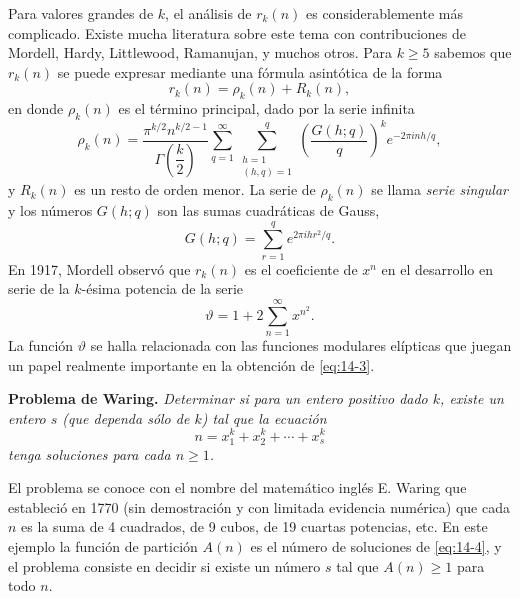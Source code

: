 \documentclass[12pt,a4paper]{book}
\begin{document}
    Para valores grandes de $k$, el análisis de $r_{k}(n)$ es considerablemente más complicado.
    Existe mucha literatura sobre este tema con contribuciones de Mordell, Hardy, Littlewood,
    Ramanujan, y muchos otros. Para $k\geq5$ sabemos que $r_{k}(n)$ se puede expresar mediante
    una fórmula asintótica de la forma
    \begin{equation}\label{eq:14-3}
        r_{k}(n)=\rho_{k}(n)+R_{k}(n),
    \end{equation}
    en donde $\rho_{k}(n)$ es el término principal, dado por la serie infinita
    \begin{equation*}
        \rho_{k}(n)=\frac{\pi^{k/2}n^{k/2-1}}{\Gamma\left(\dfrac{k}{2}\right)}\sum_{q=1}^{\infty}\sum_{\substack{h=1\\(h,q)=1}}^{q}\left(\frac{G(h;q)}{q}\right)^{k}e^{-2\pi inh/q},
    \end{equation*}
    y $R_{k}(n)$ es un resto de orden menor. La serie de $\rho_{k}(n)$ se llama \textit{serie
    singular} y los números $G(h;q)$ son las sumas cuadráticas de Gauss,
    \begin{equation*}
        G(h;q)=\sum_{r=1}^{q}e^{2\pi ihr^{2}/q}.
    \end{equation*}
    En 1917, Mordell observó que $r_{k}(n)$ es el coeficiente de $x^{n}$ en el desarrollo en serie
    de la $k$-ésima potencia de la serie
    \begin{equation*}
        \vartheta=1+2\sum_{n=1}^{\infty}x^{n^{2}}.
    \end{equation*}
    La función $\vartheta$ se halla relacionada con las funciones modulares elípticas que juegan
    un papel realmente importante en la obtención de \eqref{eq:14-3}.

    \textbf{Problema de Waring.} \textit{Determinar si para un entero positivo dado $k$, existe
    un entero $s$ (que dependa sólo de $k$) tal que la ecuación}
    \begin{equation}\label{eq:14-4}
        n=x_{1}^{k}+x_{2}^{k}+\cdots+x_{s}^{k}
    \end{equation}
    \textit{tenga soluciones para cada $n\geq1$.}

    El problema se conoce con el nombre del matemático inglés E. Waring que estableció en 1770
    (sin demostración y con limitada evidencia numérica) que cada $n$ es la suma de 4
    cuadrados, de 9 cubos, de 19 cuartas potencias, etc. En este ejemplo la función de partición
    $A(n)$ es el número de soluciones de \eqref{eq:14-4}, y el problema consiste en decidir si
    existe un número $s$ tal que $A(n)\geq1$ para todo $n$.
\end{document}
